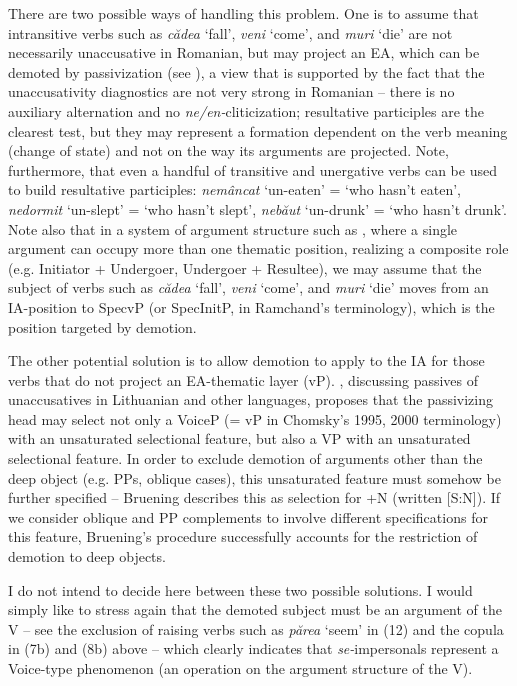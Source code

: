 \documentclass[output=paper]{langsci/langscibook}
\begin{document}
There are two possible ways of handling this problem. One is to assume that intransitive verbs such as \textit{cădea} ‘fall’, \textit{veni} ‘come’, and \textit{muri} ‘die’ are not necessarily unaccusative in Romanian, but may project an EA, which can be demoted by passivization (see \citealt{Dobrovie-Sorin1987,Dobrovie-Sorin1994}), a view that is supported by the fact that the unaccusativity diagnostics are not very strong in Romanian – there is no auxiliary alternation and no \textit{ne/en-}cliticization; resultative participles are the clearest test, but they may represent a formation dependent on the verb meaning (change of state) and not on the way its arguments are projected. Note, furthermore, that even a handful of transitive and unergative verbs can be used to build resultative participles: \textit{nemâncat} ‘un-eaten’ = ‘who hasn’t eaten’, \textit{nedormit} ‘un-slept’ = ‘who hasn’t slept’, \textit{nebăut} ‘un-drunk’ = ‘who hasn’t drunk’. Note also that in a system of argument structure such as , where a single argument can occupy more than one thematic position, realizing a composite role (e.g. Initiator + Undergoer, Undergoer + Resultee), we may assume that the subject of verbs such as \textit{cădea} ‘fall’, \textit{veni} ‘come’, and \textit{muri} ‘die’ moves from an IA-position to SpecvP (or SpecInitP, in Ramchand’s terminology), which is the position targeted by demotion.   

  The other potential solution is to allow demotion to apply to the IA for those verbs that do not project an EA-thematic layer (vP). \citet{Bruening2012}, discussing passives of unaccusatives in Lithuanian and other languages, proposes that the passivizing head may select not only a VoiceP (= vP in Chomsky’s 1995, 2000 terminology) with an unsaturated selectional feature, but also a VP with an unsaturated selectional feature. In order to exclude demotion of arguments other than the deep object (e.g. PPs, oblique cases), this unsaturated feature must somehow be further specified – Bruening describes this as selection for +N (written [S:N]). If we consider oblique and PP complements to involve different specifications for this feature, Bruening’s procedure successfully accounts for the restriction of demotion to deep objects. 

  I do not intend to decide here between these two possible solutions. I would simply like to stress again that the demoted subject must be an argument of the V – see the exclusion of raising verbs such as \textit{părea} ‘seem’ in (12) and the copula in (7b) and (8b) above – which clearly indicates that \textit{se-}impersonals represent a Voice-type phenomenon (an operation on the argument structure of the V). 
\end{document}
